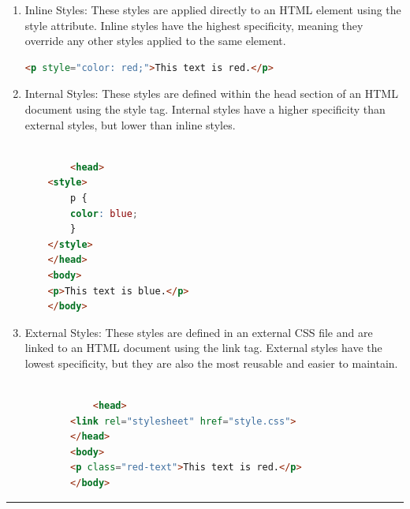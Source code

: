 \documentclass[11pt]{article}
\begin{document}
\begin{enumerate}
    \item Inline Styles: These styles are applied directly to an HTML element using the style attribute. Inline styles have the highest specificity, meaning they override any other styles applied to the same element.
    \begin{lstlisting}[language=html, caption=Inline Style]
        <p style="color: red;">This text is red.</p>
    \end{lstlisting} 

    \item Internal Styles: These styles are defined within the head section of an HTML document using the style tag. Internal styles have a higher specificity than external styles, but lower than inline styles.
    \begin{lstlisting}[language=html, caption=Internal Style]

        <head>
    <style>
        p {
        color: blue;
        }
    </style>
    </head>
    <body>
    <p>This text is blue.</p>
    </body>
    \end{lstlisting} 
    
    \item External Styles: These styles are defined in an external CSS file and are linked to an HTML document using the link tag. External styles have the lowest specificity, but they are also the most reusable and easier to maintain.
    \begin{lstlisting}[language=html, caption=External Style]
    
            <head>
        <link rel="stylesheet" href="style.css">
        </head>
        <body>
        <p class="red-text">This text is red.</p>
        </body>
    \end{lstlisting} 
\end{enumerate}



\noindent\rule{\linewidth}{0.4pt}
\end{document}
